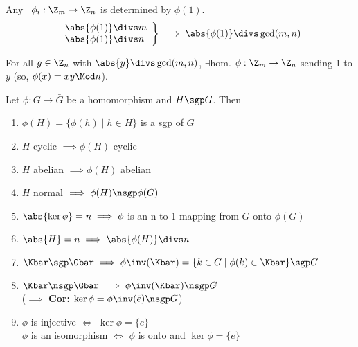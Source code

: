   \begin{example}
      Any \homo\ \(\phi_i: \Z_m\to\Z_n\) is determined by \(\phi(1)\).
       \begin{align*}
          \left.
             \begin{array}{l}
              \abs{\phi(1)} \divs m \\ \abs{\phi(1)} \divs n
          \end{array}
          \right\}\implies \abs{\phi(1)} \divs \gcd(m,n)
       \end{align*}
  \end{example}

  \begin{exercise}
    For all \(g\in\Z_n\) with \(\abs{y}\divs\gcd(m,n)\), $\exists$hom. \(\phi:\Z_m\to\Z_n\) sending 1 to \(y\) (so, \(\phi(x)=xy\Mod n\)).
  \end{exercise}

  \begin{theorem}
      Let \(\phi: G\to\bar G\) be a homomorphism and \(H\sgp G\). Then
      \begin{enumerate}
          \item \(\phi(H)=\{\phi(h)\mid h\in H\}\) is a sgp of \(\bar G\)
          \item \(H\) cyclic \(\implies \phi(H)\) cyclic
          \item \(H\) abelian \(\implies \phi(H)\) abelian
          \item \(H\) normal \(\implies \phi(H) \nsgp \phi(G)\)
          \item \(\abs{\ker\phi} = n \implies \phi\) is an n-to-1 mapping from \(G\) onto \(\phi(G)\)
          \item \(\abs{H} = n \implies \abs{\phi(H)} \divs n\)
          \item \(\Kbar \sgp \Gbar \implies \phi\inv(\Kbar)=\{k\in G\mid\phi(k)\in\Kbar\}\sgp G\)
          \item \(\Kbar \nsgp \Gbar \implies \phi\inv(\Kbar) \nsgp G\) \\
          (\(\implies\) \textbf{Cor:} \(\ker\phi = \phi\inv(\bar{e}) \nsgp G\))
          \item \(\phi\) is injective \(\iff\) \(\ker\phi=\{e\}\) \\
          \(\phi\) is an isomorphism \(\iff\) \(\phi\) is onto and \(\ker\phi=\{e\}\)
      \end{enumerate}
  \end{theorem}

